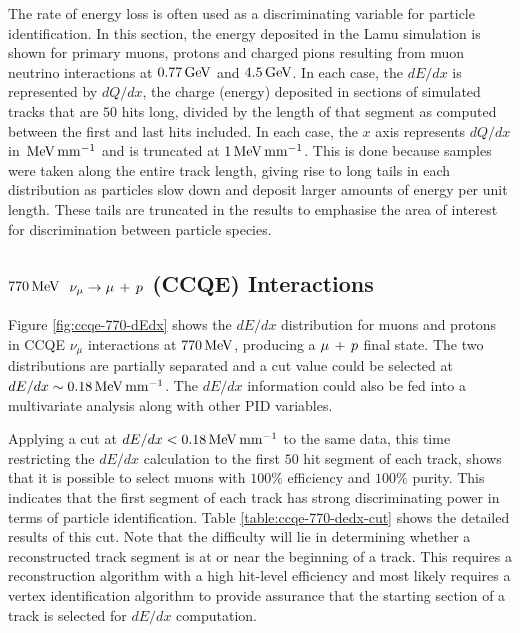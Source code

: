 The rate of energy loss is often used as a discriminating variable for particle identification. In this section, the energy deposited in the Lamu simulation is shown for primary muons, protons and charged pions resulting from muon neutrino interactions at $0.77\,\mathrm{GeV}$ and $4.5\,\mathrm{GeV}$. In each case, the $dE/dx$ is represented by $dQ/dx$, the charge (energy) deposited in sections of simulated tracks that are $50$ hits long, divided by the length of that segment as computed between the first and last hits included. In each case, the $x$ axis represents $dQ/dx$ in $\,\mathrm{MeV} \,\mathrm{mm}^{-1}$ and is truncated at $1 \,\mathrm{MeV}\,\mathrm{mm}^{-1}$. This is done because samples were taken along the entire track length, giving rise to long tails in each distribution as particles slow down and deposit larger amounts of energy per unit length. These tails are truncated in the results to emphasise the area of interest for discrimination between particle species.

\subsection{$770\,\mathrm{MeV}$ $\nu_\mu \rightarrow \mu\,+\,p$ (CCQE) Interactions}
Figure \ref{fig:ccqe-770-dEdx} shows the $dE/dx$ distribution for muons and protons in \acs{CCQE} $\nu_\mu$ interactions at $770\,\mathrm{MeV}$, producing a $\mu\,+\,p$ final state. The two distributions are partially separated and a cut value could be selected at $dE/dx \sim 0.18 \,\mathrm{MeV}\,\mathrm{mm}^{-1}$. The $dE/dx$ information could also be fed into a multivariate analysis along with other \acs{PID} variables.

Applying a cut at $dE/dx < 0.18 \,\mathrm{MeV} \,\mathrm{mm}^{-1}$ to the same data, this time restricting the $dE/dx$ calculation to the first $50$ hit segment of each track, shows that it is possible to select muons with $100\%$ efficiency and $100\%$ purity. This indicates that the first segment of each track has strong discriminating power in terms of particle identification. Table \ref{table:ccqe-770-dedx-cut} shows the detailed results of this cut. Note that the difficulty will lie in determining whether a reconstructed track segment is at or near the beginning of a track. This requires a reconstruction algorithm with a high hit-level efficiency and most likely requires a vertex identification algorithm to provide assurance that the starting section of a track is selected for $dE/dx$ computation.

